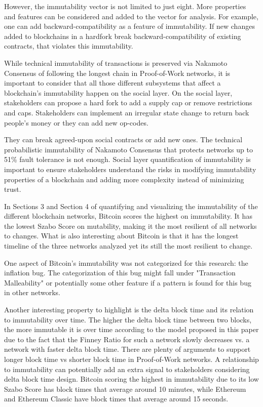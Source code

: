 \documentclass{article}
\begin{document}
However, the immutability vector is not limited to just eight. More properties and features can be considered and added to the vector for analysis. For example, one can add backward-compatibility as a feature of immutability. If new changes added to blockchains in a hardfork break backward-compatibility of existing contracts, that violates this immutability.

While technical immutability of transactions is preserved via Nakamoto Consensus of following the longest chain in Proof-of-Work networks, it is important to consider that all those different subsystems that affect a blockchain’s immutability happen on the social layer. On the social layer, stakeholders can propose a hard fork to add a supply cap or remove restrictions and caps. Stakeholders can implement an irregular state change to return back people’s money or they can add new op-codes. 

They can break agreed-upon social contracts or add new ones. The technical probabilistic immutability of Nakamoto Consensus that protects networks up to 51\% fault tolerance is not enough. Social layer quantification of immutability is important to ensure stakeholders understand the risks in modifying immutability properties of a blockchain and adding more complexity instead of minimizing trust. 

In Sections 3 and Section 4 of quantifying and visualizing the immutability of the different blockchain networks, Bitcoin scores the highest on immutability. It has the lowest Szabo Score on mutability, making it the most resilient of all networks to changes. What is also interesting about Bitcoin is that it has the longest timeline of the three networks analyzed yet its still the most resilient to change. 

One aspect of Bitcoin's immutability was not categorized for this research: the inflation bug. The categorization of this bug might fall under "Transaction Malleability" or potentially some other feature if a pattern is found for this bug in other networks.

Another interesting property to highlight is the delta block time and its relation to immutability over time. The higher the delta block time between two blocks, the more immutable it is over time according to the model proposed in this paper due to the fact that the Finney Ratio for such a network slowly decreases vs. a network with faster delta block time. There are plenty of arguments to support longer block time vs shorter block time in Proof-of-Work networks. A relationship to immutability can potentially add an extra signal to stakeholders considering delta block time design. Bitcoin scoring the highest in immutability due to its low Szabo Score has block times that average around 10 minutes, while Ethereum and Ethereum Classic have block times that average around 15 seconds.
\end{document}
